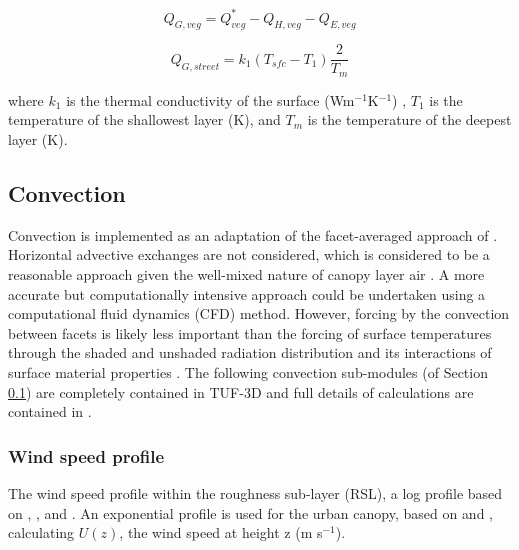 \documentclass[preprint,12pt,authoryear]{elsarticle}
\begin{document}
\begin{equation}\label{eq:qgvtuf}
 Q_{G,veg} =  Q^{*}_{veg} - Q_{H,veg} - Q_{E,veg}
\end{equation}

\begin{equation}\label{eq:qgtuf}
 Q_{G,street} = k_{1}  ( T_{sfc} - T_{1} ) \frac {2}{T_{m}}
\end{equation}

where $k_{1}$ is the thermal conductivity of the surface (Wm$^{-1}$K$^{-1}$) , $T_{1}$ is the temperature of the shallowest layer (K), and $T_{m}$ is the temperature of the deepest layer (K).


\subsection{Convection}\label{sec:convection}
Convection is implemented as an adaptation of the facet-averaged approach of \cite{Masson2000}. Horizontal advective exchanges are not considered, which is considered to be a reasonable approach given the well-mixed nature of canopy layer air \citep{Krayenhoff2007}. A more accurate but computationally intensive approach could be undertaken using a computational fluid dynamics (CFD) method. However, forcing by the convection between facets is likely less important than the forcing of surface temperatures through the shaded and unshaded radiation distribution and its interactions of surface material properties \citep{Krayenhoff2007}. The following convection sub-modules (of Section \ref{sec:convection}) are completely contained in TUF-3D and full details of calculations are contained in \cite{Krayenhoff2007}.

\subsubsection{Wind speed profile}\label{sec:windspeedprofile}
The wind speed profile within the roughness sub-layer (RSL), a log profile based on \cite{Masson2000}, \cite{Kusaka2001}, and \cite{Harman2004}. An exponential profile is used for the urban canopy, based on \cite{Masson2000} and \cite{Rotach1995}, calculating $U(z)$, the wind speed at height z (m s$^{-1}$).


%
%
\end{document}
